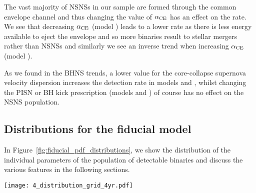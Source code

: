 The vast majority of NSNSs in our sample are formed through the common envelope channel and thus changing the value of $\alpha_{\rm CE}$ has an effect on the rate. We see that decreasing $\alpha_{\rm CE}$ (model \modAlphaLow) leads to a lower rate as there is less energy available to eject the envelope and so more binaries result to stellar mergers rather than NSNSs and similarly we see an inverse trend when increasing $\alpha_{\rm CE}$ (model \modAlphaHigh).

As we found in the BHNS trends, a lower value for the core-collapse supernova velocity dispersion increases the detection rate in models \modSigLow{} and \modSigLower{}, whilst changing the PISN or BH kick prescription (models \modNoPISN{} and \modNoBH{}) of course has no effect on the NSNS population.

\subsection{Distributions for the fiducial model}\label{sec:fiducial_distributions}

In Figure~\ref{fig:fiducial_pdf_distributions}, we show the distribution of the individual parameters of the population of detectable binaries and discuss the various features in the following sections.

\begin{figure*}[htbp]
    \centering
    \texttt{[image: 4\_distribution\_grid\_4yr.pdf]}
    \caption{Distributions for various parameters of the DCOs that are detectable in a 4-year LISA mission in our fiducial model. Each panel shows the distribution of a single parameter, where the colour denotes the DCO type. We also plot the 1- and 2-$\sigma$ uncertainties (obtained via bootstrapping) with the dark and light shaded areas respectively. The first two rows (excluding metallicity) use kernel density estimators to show the distributions. The dotted lines in the black hole mass panel show the individual distributions of the primary and secondary masses. The metallicity panel shows the distribution over the metallicity bins used in our population synthesis, which we show in the grid lines. The final three panels for the cumulative distribution functions for observables, normalised to the expected number of fiducial detections in a 4-year LISA mission. The dark shaded areas indicate regimes in which the quantity cannot be measured. The dotted lines in the angular resolution plot show the maximum angular resolution that can be covered by a single pointing of the labelled instrument. In Section~\ref{sec:fiducial_distributions} we discuss the features of the distributions.}
    \label{fig:fiducial_pdf_distributions}
\end{figure*}


